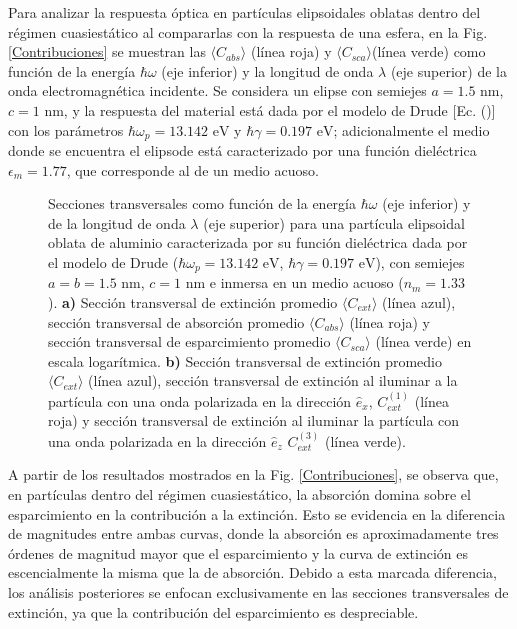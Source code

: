 Para analizar la respuesta óptica en partículas elipsoidales oblatas dentro del régimen cuasiestático al compararlas con la respuesta de una esfera, en la Fig. \ref{Contribuciones} se muestran las $\langle C_{abs} \rangle$ (línea roja) y $\langle C_{sca} \rangle$(línea verde) como función de la energía $\hbar\omega$ (eje inferior) y la longitud de onda $\lambda$ (eje superior) de la onda electromagnética incidente. Se considera un elipse con semiejes $a=1.5\text{ nm}$, $c=1\text{ nm}$, y la respuesta del material está dada por el modelo de Drude [Ec. ()] con los parámetros $\hbar\omega_p=13.142\text{ eV}$ y $\hbar\gamma=0.197\text{ eV}$; adicionalmente el medio donde se encuentra el elipsode está caracterizado por una función dieléctrica $\epsilon_m=1.77$, que corresponde al de un medio acuoso.\\
\begin{figure}[h!]
	\quad%
	\caption{Secciones transversales como función de la energía $\hbar\omega$ (eje inferior) y de la longitud de onda $\lambda$ (eje superior) para una partícula elipsoidal oblata de aluminio caracterizada por su función dieléctrica dada por el modelo de Drude ($\hbar\omega_p=13.142\text{ eV}$, $\hbar\gamma=0.197\text{ eV}$), con semiejes $a=b=1.5\text{ nm}$, $c=1\text{ nm}$ e inmersa en un medio acuoso ($n_m=1.33$). \textbf{a)}  Sección transversal de extinción promedio $\langle C_{ext}\rangle$  (línea azul), sección transversal de absorción promedio $\langle C_{abs}\rangle$  (línea roja) y sección transversal de esparcimiento promedio $\langle C_{sca}\rangle$  (línea verde) en escala logarítmica. \textbf{b)} Sección transversal de extinción promedio $\langle C_{ext}\rangle$ (línea azul), sección transversal de extinción al iluminar a la partícula con una onda polarizada en la dirección $\hat{e}_x$, $C_{ext}^{(1)}$  (línea roja)  y sección transversal de extinción al iluminar la partícula con una onda polarizada en la dirección $\hat{e}_z$ $C_{ext}^{(3)}$  (línea verde).} \label{fig:test}
\end{figure}

A partir de los resultados mostrados en la Fig. \ref{Contribuciones}, se observa que, en partículas dentro del régimen cuasiestático, la absorción domina sobre el esparcimiento en la contribución a la extinción. Esto se evidencia en la diferencia de magnitudes entre ambas curvas, donde la absorción es aproximadamente tres órdenes de magnitud mayor que el esparcimiento y la curva de extinción es escencialmente la misma que la de absorción. Debido a esta marcada diferencia, los análisis posteriores se enfocan exclusivamente en las secciones transversales de extinción, ya que la contribución del esparcimiento es despreciable.\\

